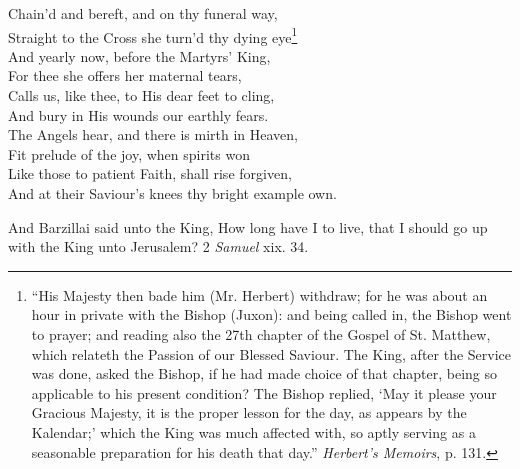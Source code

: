  Chain’d and bereft, and on thy funeral way, \\
 Straight to the Cross she turn’d thy dying eye\footnote{“His Majesty then bade him (Mr. Herbert) withdraw; for he was about an hour in private with the Bishop (Juxon): and being called in, the Bishop went to prayer; and reading also the 27th chapter of the Gospel of St. Matthew, which relateth the Passion of our Blessed Saviour. The King, after the Service was done, asked the Bishop, if he had made choice of that chapter, being so applicable to his present condition? The Bishop replied, ‘May it please your Gracious Majesty, it is the proper lesson for the day, as appears by the Kalendar;’ which the King was much affected with, so aptly serving as a seasonable preparation for his death that day.” \emph{Herbert’s Memoirs}, p. 131.} \\
  And yearly now, before the Martyrs’ King, \\
 For thee she offers her maternal tears, \\
 Calls us, like thee, to His dear feet to cling, \\
 And bury in His wounds our earthly fears. \\
  The Angels hear, and there is mirth in Heaven, \\
 Fit prelude of the joy, when spirits won \\
 Like those to patient Faith, shall rise forgiven, \\
 And at their Saviour’s knees thy bright example own.\\


And Barzillai said unto the King, How long have I to live, that I should go up with the King unto Jerusalem? 2 \emph{Samuel} xix. 34.

